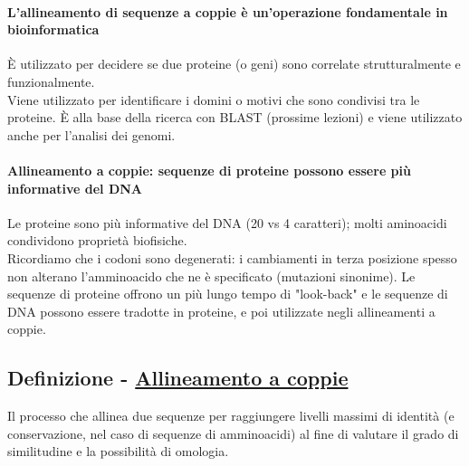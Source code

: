 \documentclass{article}
\begin{document}
\paragraph{L'allineamento di sequenze a coppie è un'operazione fondamentale in bioinformatica}
È utilizzato per decidere se due proteine (o geni) sono correlate strutturalmente e funzionalmente.\\
Viene utilizzato per identificare i domini o motivi che sono
condivisi tra le proteine. È alla base della ricerca con BLAST (prossime lezioni) e viene utilizzato anche per l'analisi dei genomi.
\paragraph{Allineamento a coppie: sequenze di proteine possono essere più informative del DNA}
Le proteine sono più informative del DNA (20 vs 4 caratteri);
molti aminoacidi condividono proprietà biofisiche.\\
Ricordiamo che i codoni sono degenerati: i cambiamenti in terza posizione
spesso non alterano l'amminoacido che ne è specificato
(mutazioni sinonime). Le sequenze di proteine offrono un più lungo tempo di
"look-back" e le sequenze di DNA possono essere tradotte in proteine,
e poi utilizzate negli allineamenti a coppie.
\subsection{Definizione - \underline{Allineamento a coppie}}
Il processo che allinea due sequenze per
raggiungere livelli massimi di identità (e
conservazione, nel caso di sequenze di
amminoacidi) al fine di valutare il grado di
similitudine e la possibilità di omologia.
\end{document}
